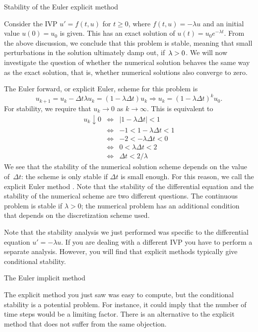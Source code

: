  {Stability of the  Euler explicit method}

Consider the \ac{IVP} $u'=f(t,u)$ for $t\geq0$, 
where $f(t,u)=-\lambda u$ and an initial value $u(0)=u_0$ is given.
This has an exact solution
of $u(t)=u_0e^{-\lambda t}$. From the above discussion, we conclude
that this problem is stable, meaning that small perturbations in the
solution ultimately damp out, if~$\lambda>\nobreak0$. We will now
investigate the question of whether the numerical solution behaves the
same way as the exact solution, that is, 
whether numerical solutions also converge
to zero.

The Euler forward, or explicit Euler, scheme for this problem is
\[ u_{k+1}=u_k-\Delta t \lambda u_k=(1-\lambda \Delta t)u_k
  \Rightarrow
  u_k=(1-\lambda\Delta t)^ku_0.
\]
For stability, we require that
$u_k\rightarrow 0$ as $k\rightarrow\infty$. This is equivalent to
  \begin{eqnarray*}
    u_k\downarrow 0
    &\Leftrightarrow&|1-\lambda \Delta t|<1\\
    &\Leftrightarrow&-1<1-\lambda\Delta t<1\\
    &\Leftrightarrow&-2<-\lambda\Delta t<0\\
    &\Leftrightarrow&0<\lambda\Delta t<2\\
    &\Leftrightarrow&\Delta t<2/\lambda
  \end{eqnarray*}
We see that the stability of the numerical solution scheme depends on
the value of~$\Delta t$: the scheme is only stable if $\Delta t$ is
small enough.  For this reason, we call the explicit Euler method
. Note that the stability of the
differential equation and the stability of the numerical scheme are
two different questions. The continuous problem is stable if
$\lambda>0$; the numerical problem has an additional condition that
depends on the discretization scheme used.

Note that the stability analysis we just performed was specific to the
differential equation $u'=-\lambda u$. If you are dealing with a
different \ac{IVP} you have to perform a separate analysis. However,
you will find that explicit methods typically give conditional stability.


 {The Euler implicit method}
\label{sec:implicit-euler}

The explicit method you just saw was easy to compute, but the
conditional stability is a potential problem. For instance, it could
imply that the number of time steps would be a limiting factor.
There is an alternative to the explicit method that does not suffer
from the same objection.

